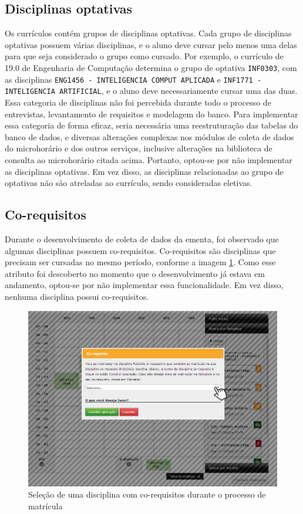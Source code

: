 \subsection{Disciplinas optativas}
\label{sec:Disciplinas optativas}

Os currículos contém grupos de disciplinas optativas. Cada grupo de disciplinas optativas possuem várias disciplinas, e o aluno deve cursar pelo menos uma delas para que seja considerado o grupo como cursado. Por exemplo, o currículo de 19.0 de Engenharia de Computação determina o grupo de optativa \verb|INF0303|, com as disciplinas \verb|ENG1456 - INTELIGENCIA COMPUT APLICADA| e \verb|INF1771 - INTELIGENCIA ARTIFICIAL|, e o aluno deve necessariamente cursar uma das duas. Essa categoria de disciplinas não foi percebida durante todo o processo de entrevistas, levantamento de requisitos e modelagem do banco. Para implementar essa categoria de forma eficaz, seria necessária uma reestruturação das tabelas do banco de dados, e diversas alterações complexas nos módulos de coleta de dados do microhorário e dos outros serviços, inclusive alterações na biblioteca de consulta ao microhorário citada acima. Portanto, optou-se por não implementar as disciplinas optativas. Em vez disso, as disciplinas relacionadas ao grupo de optativas não são atreladas ao currículo, sendo consideradas eletivas.

\subsection{Co-requisitos}
\label{sec:Co-requisitos}
Durante o desenvolvimento de coleta de dados da ementa, foi observado que algumas disciplinas possuem co-requisitos. Co-requisitos são disciplinas que precisam ser cursadas no mesmo período, conforme a imagem \ref{fig:corequisito}. Como esse atributo foi descoberto no momento que o desenvolvimento já estava em andamento, optou-se por não implementar essa funcionalidade. Em vez disso, nenhuma disciplina possui co-requisitos.

\begin{figure}[ht]
    \begin{center}
    \includegraphics[width=350pt]{figuras/corequisitos.png}
    \caption{Seleção de uma disciplina com co-requisitos durante o processo de matrícula}
    \label{fig:corequisito}
    \end{center}
\end{figure}

